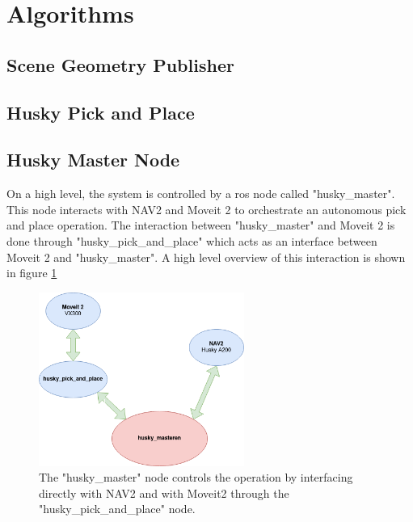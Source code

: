 \section{Algorithms}

\subsection{Scene Geometry Publisher}

\subsection{Husky Pick and Place}


\subsection{Husky Master Node}
On a high level, the system is controlled by a ros node called "husky\_master". This node interacts with NAV2 and Moveit 2 to orchestrate an autonomous pick and place operation. The interaction between "husky\_master" and Moveit 2 is done through "husky\_pick\_and\_place" which acts as an interface between Moveit 2 and "husky\_master". A high level overview of this interaction is shown in figure \ref{fig:husky_master}

\begin{figure}[H]
  \centering
  \includegraphics[width = 0.6\textwidth]{Figures/software_overview.drawio.png}
  \caption{The "husky\_master" node controls the operation by interfacing directly with NAV2 and with Moveit2 through the "husky\_pick\_and\_place" node.}
  \label{fig:husky_master}
\end{figure}
